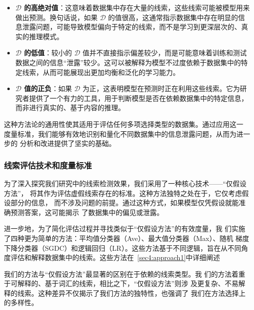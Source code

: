 \begin{itemize}
  \item \textbf{$\mathcal{D}$ 的高绝对值}：这意味着数据集中存在大量的线索，这些线索可能被模型用来做出预测。换句话说，如果 $\mathcal{D}$ 的值很高，这通常指示数据集中存在明显的信息泄露问题，可能导致模型偏向于特定的线索，而不是学习到更深层次的、真实的推理模式。
  \item \textbf{$\mathcal{D}$ 的低值}：较小的 $\mathcal{D}$ 值并不直接指示偏差较少，而是可能意味着训练和测试数据之间的信息``泄露''较少。这可以被解释为模型不过度依赖于数据集中的特定线索，从而可能展现出更加均衡和泛化的学习能力。
  \item \textbf{$\mathcal{D}$ 值的正负}：如果 $\mathcal{D}$ 为正，这表明模型在预测时正在利用这些线索。它为研究者提供了一个有力的工具，用于判断模型是否在依赖数据集中的特定信息，而非进行真实的、基于内容的推理。
\end{itemize}

这种方法论的通用性使其适用于评估任何多项选择类型的数据集。通过应用这一
度量标准，我们能够有效地识别和量化不同数据集中的信息泄露问题，从而为进一步的
分析和改进提供了坚实的基础。

\subsubsection*{线索评估技术和度量标准}

为了深入探究我们研究中的线索检测效果，我们采用了一种核心技术——``仅假设方法''，
将其作为评估虚假线索存在的标准。这种方法独特之处在于，它仅考虑假设部分的信息，
而不涉及问题的前提。通过这种方式，如果模型仅凭假设就能准确预测答案，这可能揭示
了数据集中的偏见或泄露。

进一步地，为了简化评估过程并寻找类似于``仅假设方法''的有效度量，我
们实施了四种更为简单的方法：平均值分类器（Ave）、最大值分类器（Max）、随机
梯度下降分类器（SGDC）和逻辑回归（LR）。这些方法基于不同逻辑，旨在从不同角
度评估和解释数据集中的线索。这些方法在~\ref{sec4:approach1}中详细阐述

我们的方法与``仅假设方法''最显著的区别在于依赖的线索类型。我
们的方法着重于可解释的、基于词汇的线索，相比之下，``仅假设方法''则涉
及更复杂、不易解释的线索。这种差异不仅揭示了我们方法的独特性，也强调了
我们在方法选择上的多样性。

